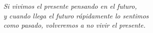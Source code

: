 \thispagestyle{empty}
\begin{flushright}
\textit{Si vivimos el presente pensando en el futuro,\\
	y cuando llega el futuro rápidamente lo sentimos\\
   como pasado, volveremos a no vivir el presente.}
\end{flushright}
